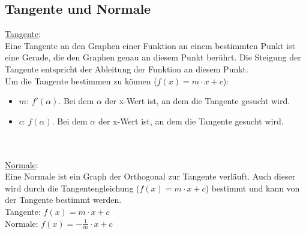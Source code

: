 \subsection{Tangente und Normale}
\underline{Tangente}: \\
Eine Tangente an den Graphen einer Funktion an einem bestimmten Punkt ist eine Gerade, 
die den Graphen genau an diesem Punkt berührt. 
Die Steigung der Tangente entspricht der Ableitung der Funktion an diesem Punkt. \\
Um die Tangente bestimmen zu können ($f(x) = m\cdot x + c$):
\begin{itemize}
    \item $m$: $f'(\alpha)$. Bei dem $\alpha$ der x-Wert ist, an dem die Tangente gesucht wird.
    \item $c$: $f(\alpha)$. Bei dem $\alpha$ der x-Wert ist, an dem die Tangente gesucht wird.
\end{itemize} 
\
\\\\
\underline{Normale}: \\
Eine Normale ist ein Graph der Orthogonal zur Tangente verläuft. 
Auch dieser wird durch die Tangentengleichung ($f(x) = m\cdot x + c$) bestimmt und kann von der Tangente bestimmt werden. \\
Tangente: $f(x) = m \cdot x + c$ \\
Normale: 
$
f(x) = -\frac{1}{m} \cdot x + c
$
